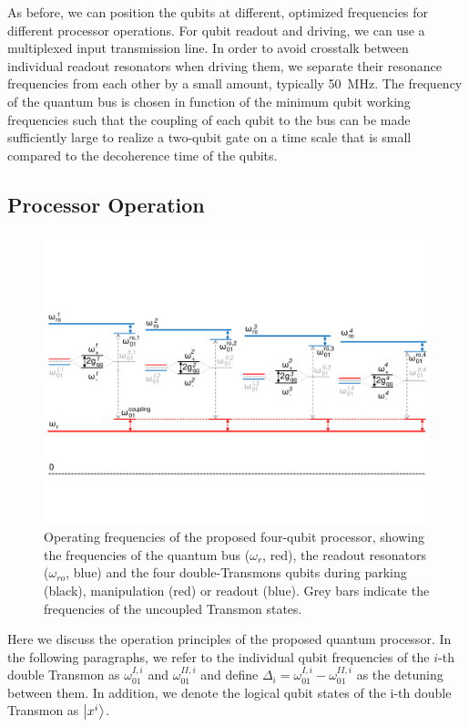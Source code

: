 \smallskip

As before, we can position the qubits at different, optimized frequencies for different processor operations. For qubit readout and driving, we can use a multiplexed input transmission line. In order to avoid crosstalk between individual readout resonators when driving them, we separate their resonance frequencies from each other by a small amount, typically \mbox{50 MHz}. The frequency of the quantum bus is chosen in function of the minimum qubit working frequencies such that the coupling of each qubit to the bus can be made sufficiently large to realize a two-qubit gate on a time scale that is small compared to the decoherence time of the qubits. 

\subsection{Processor Operation}

\begin{figure}[ht!]
	\centering
	\includegraphics[width=\textwidth]{./material/figures/scalable-architecture/qubit_architecture_energy_levels}
	\caption[]{Operating frequencies of the proposed four-qubit processor, showing the frequencies of the quantum bus ($\omega_r$, red), the readout resonators ($\omega_{ro}$, blue) and the four double-Transmons qubits during parking (black), manipulation (red) or readout (blue). Grey bars indicate the frequencies of the uncoupled Transmon states.}
	\label{fig:scalable_architecture_energy_levels}
\end{figure}

Here we discuss the operation principles of the proposed quantum processor. In the following paragraphs, we refer to the individual qubit frequencies of the $i$-th double Transmon as $\omega_{01}^{I,i}$ and $\omega_{01}^{II,i}$ and define $\Delta_i = \omega_{01}^{I,i}-\omega_{01}^{II,i}$ as the detuning between them. In addition, we denote the logical qubit states of the i-th double Transmon as $\left| x^i \right>$. 

